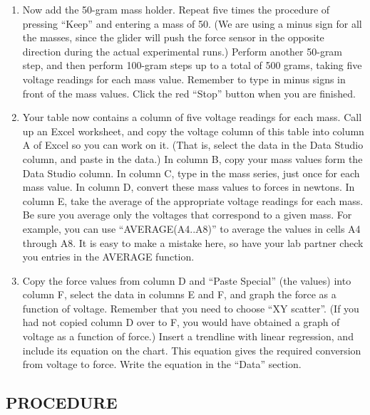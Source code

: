 \begin{enumerate}[label=\arabic*.]
\item Now add the 50-gram mass holder.  Repeat five times the procedure of pressing ``Keep'' and entering a mass of 50.  (We are using a minus sign for all the masses, since the glider will push the force sensor in the opposite direction during the actual experimental runs.)  Perform another 50-gram step, and then perform 100-gram steps up to a total of 500 grams, taking five voltage readings for each mass value.  Remember to type in minus signs in front of the mass values.  Click the red ``Stop'' button when you are finished.

\item Your table now contains a column of five voltage readings for each mass.  Call up an Excel worksheet, and copy the voltage column of this table into column A of Excel so you can work on it.  (That is, select the data in the Data Studio column, and paste in the data.)  In column B, copy your mass values form the Data Studio column.  In column C, type in the mass series, just once for each mass value.  In column D, convert these mass values to forces in newtons.  In column E, take the average of the appropriate voltage readings for each mass.  Be sure you average only the voltages that correspond to a given mass.  For example, you can use ``AVERAGE(A4..A8)'' to average the values in cells A4 through A8.  It is easy to make a mistake here, so have your lab partner check you entries in the AVERAGE function.

\item Copy the force values from column D and ``Paste Special'' (the values) into column F, select the data in columns E and F, and graph the force as a function of voltage.  Remember that you need to choose ``XY scatter''.  (If you had not copied column D over to F, you would have obtained a graph of voltage as a function of force.)  Insert a trendline with linear regression, and include its equation on the chart.  This equation gives the required conversion from voltage to force.  Write the equation in the ``Data'' section.

\end{enumerate}

\subsection*{PROCEDURE}

